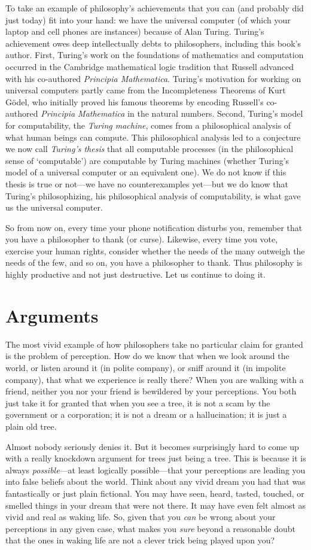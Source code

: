 \documentclass[oneside,letterpaper,12pt]{book}
\begin{document}
To take an example of philosophy's achievements that you can (and probably did just today) fit into your hand: we have the universal computer (of which your laptop and cell phones are instances) because of Alan Turing. Turing's achievement owes deep intellectually debts to philosophers, including this book's author. First, Turing's work on the foundations of mathematics and computation occurred in the Cambridge mathematical logic tradition that Russell advanced with his co-authored \emph{Principia Mathematica}. Turing's motivation for working on universal computers partly came from the Incompleteness Theorems of Kurt G\"odel, who initially proved his famous theorems by encoding Russell's co-authored \emph{Principia Mathematica} in the natural numbers. Second, Turing's model for computability, the \emph{Turing machine}, comes from a philosophical analysis of what human beings can compute. This philosophical analysis led to a conjecture we now call \emph{Turing's thesis} that all computable processes (in the philosophical sense of `computable') are computable by Turing machines (whether Turing's model of a universal computer or an equivalent one). We do not know if this thesis is true or not---we have no counterexamples yet---but we do know that Turing's philosophizing, his philosophical analysis of computability, is what gave us the universal computer. 

So from now on, every time your phone notification disturbs you, remember that you have a philosopher to thank (or curse). Likewise, every time you vote, exercise your human rights, consider whether the needs of the many outweigh the needs of the few, and so on, you have a philosopher to thank. Thus philosophy is highly productive and not just destructive. Let us continue to doing it.
\section*{Arguments}
The most vivid example of how philosophers take no particular claim for granted is the problem of perception. How do we know that when we look around the world, or listen around it (in polite company), or sniff around it (in impolite company), that what we experience is really there? When you are walking with a friend, neither you nor your friend is bewildered by your perceptions. You both just take it for granted that when you see a tree, it is not a scam by the government or a corporation; it is not a dream or a hallucination; it is just a plain old tree.

Almost nobody seriously denies it. But it becomes surprisingly hard to come up with a really knockdown argument for trees just being a tree. This is because it is always \emph{possible}---at least logically possible---that your perceptions are leading you into false beliefs about the world. Think about any vivid dream you had that was fantastically or just plain fictional. You may have seen, heard, tasted, touched, or smelled things in your dream that were not there. It may have even felt almost as vivid and real as waking life. So, given that you \emph{can} be wrong about your perceptions in any given case, what makes you \emph{sure} beyond a reasonable doubt that the ones in waking life are not a clever trick being played upon you?
\end{document}
